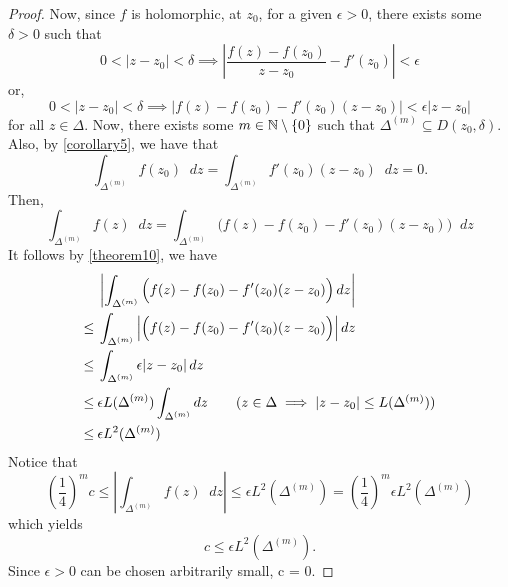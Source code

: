 \documentclass[11pt]{article}
\newcommand*\dif{\mathop{}\!d}
\begin{document}
\begin{proof}
	Now, since $f$ is holomorphic, at $z_0$, for a given $\epsilon > 0$, there
	exists some $\delta > 0$ such that
	\begin{equation*}
		0 < |z - z_0| < \delta \implies \left|\frac{f(z) - f(z_0)}{z-z_0} -
		f'(z_0)\right| < \epsilon
	\end{equation*}
	or,
	\begin{equation*}
		0 < |z - z_0| < \delta \implies \left|f(z) - f(z_0) - f'(z_0)(z-z_0)|
		< \epsilon|z-z_0|
	\end{equation*}
	for all $z \in \Delta$. Now, there exists some $m \in \mathbb{N} \setminus \{0\}$
	such that $\Delta^{(m)} \subseteq D(z_0, \delta)$. Also, by
	\cref{corollary5}, we have that
	\begin{equation*}
		\int_{\Delta^{(m)}} f(z_0) \dif z = \int_{\Delta^{(m)}} f'(z_0)(z-z_0)
		\dif z = 0.
	\end{equation*}
	Then,
	\begin{equation*}
		\int_{\Delta^{(m)}} f(z) \dif z = \int_{\Delta^{(m)}} \Big(f(z) - f(z_0)
		- f'(z_0)(z - z_0)\Big) \dif z
	\end{equation*}
	It follows by \cref{theorem10}, we have
	\begin{align*}
		&\>\left|\int_{\Delta^{(m)}} \Big(f(z) - f(z_0) - f'(z_0)(z - z_0)\Big)
		\dif z\right|\\
		\leq&\>\int_{\Delta^{(m)}}\left|\Big(f(z) - f(z_0) - f'(z_0)(z -
		z_0)\Big) \right| \dif z\\
		\leq&\>\int_{\Delta^{(m)}} \epsilon|z-z_0| \dif z\\
		\leq&\>\epsilon L(\Delta^{(m)})\int_{\Delta^{(m)}} \dif z \tag{$z \in
		\Delta\implies|z-z_0|\leq L(\Delta^{(m)})$}\\
		\leq&\>\epsilon L^2(\Delta^{(m)})
	\end{align*}
	Notice that
	\begin{equation*}
		\left(\frac{1}{4}\right)^m c \leq \left|\int_{\Delta^{(m)}}f(z)\dif z
		\right|\leq \epsilon L^2(\Delta^{(m)}) =
		\left(\frac{1}{4}\right)^m\epsilon L^2(\Delta^{(m)})
	\end{equation*}
	which yields
	\begin{equation*}
		c \leq \epsilon L^2(\Delta^{(m)}).
	\end{equation*}
	Since $\epsilon >0$ can be chosen arbitrarily small, c = 0.
\end{proof}
\end{document}
